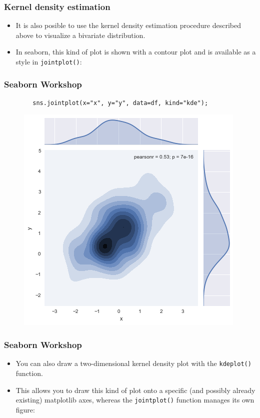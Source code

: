 \documentclass{beamer}
\begin{document}
\begin{frame}[fragile]
	\frametitle{Kernel density estimation}
	\large
	\begin{itemize}
		\item It is also posible to use the kernel density estimation procedure described above to visualize a bivariate distribution. 
		\item In seaborn, this kind of plot is shown with a contour plot and is available as a style in \texttt{jointplot()}:
	\end{itemize}
	
\end{frame}
\begin{frame}[fragile]
	\frametitle{Seaborn Workshop}
	\large
	\begin{framed}
		\begin{verbatim}
		sns.jointplot(x="x", y="y", data=df, kind="kde");
		\end{verbatim}
	\end{framed}
	\begin{figure}
		\centering
		\includegraphics[width=0.55\linewidth]{images/distributions_34_0}
	\end{figure}
\end{frame}
\begin{frame}[fragile]
	\frametitle{Seaborn Workshop}
	\large
	\begin{itemize}
		\item You can also draw a two-dimensional kernel density plot with the \texttt{kdeplot()} function.
		\item  This allows you to draw this kind of plot onto a specific (and possibly already existing) matplotlib axes, whereas the \texttt{jointplot()} function manages its own figure:
	\end{itemize}
\end{frame}
\end{document}
